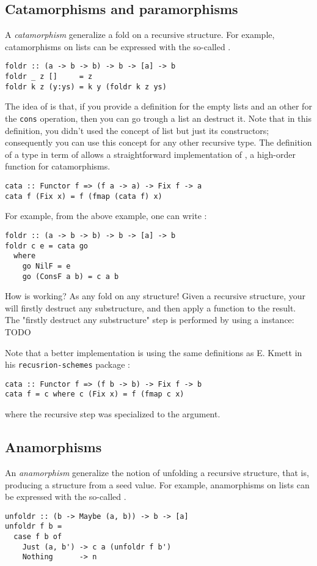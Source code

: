 \subsection{Catamorphisms and paramorphisms}
A \emph{catamorphism} generalize a fold on a recursive structure. For example, catamorphisms on lists can be expressed with the so-called .
\begin{verbatim}
foldr :: (a -> b -> b) -> b -> [a] -> b
foldr _ z []     = z
foldr k z (y:ys) = k y (foldr k z ys)
\end{verbatim}
The idea of  is that, if you provide a definition for the empty lists and an other for the \verb|cons| operation, then you can go trough a list an destruct it. Note that in this definition, you didn't used the concept of list but just its constructors; consequently you can use this concept for any other recursive type. The definition of a type in term of  allows a straightforward implementation of , a high-order function for catamorphisms.

\begin{verbatim}
cata :: Functor f => (f a -> a) -> Fix f -> a
cata f (Fix x) = f (fmap (cata f) x)
\end{verbatim}
For example,  from the above example, one can write :
\begin{verbatim}
foldr :: (a -> b -> b) -> b -> [a] -> b
foldr c e = cata go
  where
    go NilF = e
    go (ConsF a b) = c a b
\end{verbatim}

How  is working? As any fold on any structure! Given a recursive structure, your will firstly destruct any substructure, and then apply a function to the result. The "firstly destruct any substructure" step is performed by using a  instance: TODO

Note that a better implementation is using the same definitions as E. Kmett in his \verb|recusrion-schemes| package \cite{ekmett:eschems}:

\begin{verbatim}
cata :: Functor f => (f b -> b) -> Fix f -> b
cata f = c where c (Fix x) = f (fmap c x)
\end{verbatim}

where the recursive step was specialized to the  argument.

\subsection{Anamorphisms}
An \emph{anamorphism} generalize the notion of unfolding a recursive structure, that is, producing a structure from a seed value.
For example, anamorphisms on lists can be expressed with the so-called .
\begin{verbatim}
unfoldr :: (b -> Maybe (a, b)) -> b -> [a]
unfoldr f b = 
  case f b of
    Just (a, b') -> c a (unfoldr f b')
    Nothing      -> n
\end{verbatim}

